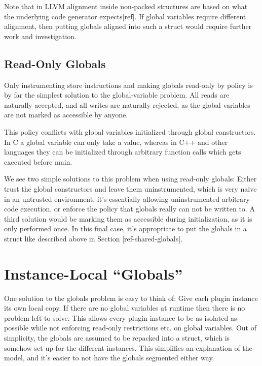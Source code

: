 Note that in LLVM alignment inside non-packed structures are based on what the
underlying code generator expects[ref].
If global variables require different alignment, then putting globals aligned
into such a struct would require further work and investigation.

\subsection {Read-Only Globals}

Only instrumenting store instructions and making globals read-only by policy is
by far the simplest solution to the global-variable problem. All reads are
naturally accepted, and all writes are naturally rejected, as the global
variables are not marked as accessible by anyone.

This policy conflicts with global variables initialized through global
constructors.
In C a global variable can only take a value, whereas in C++ and other languages
they can be initialized through arbitrary function calls which gets executed
before main.

We see two simple solutions to this problem when using read-only globals: Either
trust the global constructors and leave them uninstrumented, which is very
naive in an untrusted environment, it's essentially allowing uninstrumented
arbitrary-code execution, or enforce the policy that globals really can not be
written to.
A third solution would be marking them as accessible during initialization, as
it is only performed once.
In this final case, it's appropriate to put the globals in a struct like
described above in Section [ref-shared-globals].


\section {Instance-Local ``Globals''}

One solution to the globals problem is easy to think of: Give each plugin
instance its own local copy.
If there are no global variables at runtime then there is no problem left to
solve.
This allows every plugin instance to be as isolated as possible while not
enforcing read-only restrictions etc. on global variables.
Out of simplicity, the globals are assumed to be repacked into a struct, which
is somehow set up for the different instances.
This simplifies an explanation of the model, and it's easier to not have the
globals segmented either way.

